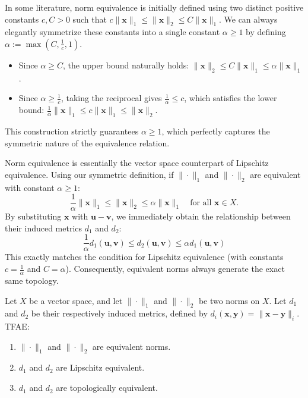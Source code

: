 \begin{remark}
In some literature, norm equivalence is initially defined using two distinct positive constants $c, C > 0$ such that $c\|\mathbf{x}\|_1 \le \|\mathbf{x}\|_2 \le C\|\mathbf{x}\|_1$. 
We can always elegantly symmetrize these constants into a single constant $\alpha \ge 1$ by defining $\alpha := \max\left(C, \frac{1}{c}, 1\right)$. 
\begin{itemize}
    \item Since $\alpha \ge C$, the upper bound naturally holds: $\|\mathbf{x}\|_2 \le C\|\mathbf{x}\|_1 \le \alpha\|\mathbf{x}\|_1$.
    \item Since $\alpha \ge \frac{1}{c}$, taking the reciprocal gives $\frac{1}{\alpha} \le c$, which satisfies the lower bound: $\frac{1}{\alpha}\|\mathbf{x}\|_1 \le c\|\mathbf{x}\|_1 \le \|\mathbf{x}\|_2$.
\end{itemize}
This construction strictly guarantees $\alpha \ge 1$, which perfectly captures the symmetric nature of the equivalence relation.
\end{remark}

\begin{remark}
Norm equivalence is essentially the vector space counterpart of Lipschitz equivalence. 
Using our symmetric definition, if $\|\cdot\|_1$ and $\|\cdot\|_2$ are equivalent with constant $\alpha \ge 1$:
$$ \frac{1}{\alpha}\|\mathbf{x}\|_1 \le \|\mathbf{x}\|_2 \le \alpha\|\mathbf{x}\|_1 \quad \text{for all } \mathbf{x} \in X. $$
By substituting $\mathbf{x}$ with $\mathbf{u} - \mathbf{v}$, we immediately obtain the relationship between their induced metrics $d_1$ and $d_2$:
$$ \frac{1}{\alpha}d_1(\mathbf{u}, \mathbf{v}) \le d_2(\mathbf{u}, \mathbf{v}) \le \alpha d_1(\mathbf{u}, \mathbf{v}) $$
This exactly matches the condition for Lipschitz equivalence (with constants $c = \frac{1}{\alpha}$ and $C = \alpha$). Consequently, equivalent norms always generate the exact same topology.
\end{remark}



\begin{theorem}
Let $X$ be a vector space, and let $\|\cdot\|_1$ and $\|\cdot\|_2$ be two norms on $X$. Let $d_1$ and $d_2$ be their respectively induced metrics, defined by $d_i(\mathbf{x}, \mathbf{y}) = \|\mathbf{x} - \mathbf{y}\|_i$. 
TFAE:
\begin{enumerate}
    \item $\|\cdot\|_1$ and $\|\cdot\|_2$ are equivalent norms.
    \item $d_1$ and $d_2$ are Lipschitz equivalent.
    \item $d_1$ and $d_2$ are topologically equivalent.
\end{enumerate}
\end{theorem}

